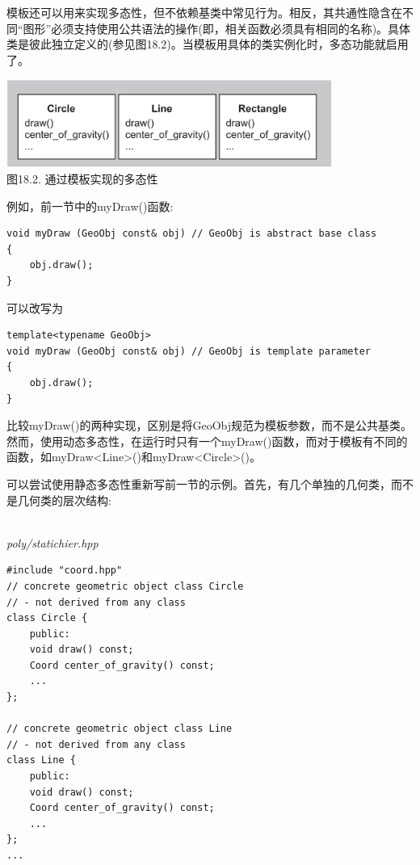 
模板还可以用来实现多态性，但不依赖基类中常见行为。相反，其共通性隐含在不同“图形”必须支持使用公共语法的操作(即，相关函数必须具有相同的名称)。具体类是彼此独立定义的(参见图18.2)。当模板用具体的类实例化时，多态功能就启用了。

\begin{center}
\includegraphics[width=0.8\textwidth]{content/3/chapter18/images/2.png} \\
图18.2. 通过模板实现的多态性
\end{center}

例如，前一节中的myDraw()函数:

\begin{lstlisting}[style=styleCXX]
void myDraw (GeoObj const& obj) // GeoObj is abstract base class
{
	obj.draw();
}
\end{lstlisting}

可以改写为

\begin{lstlisting}[style=styleCXX]
template<typename GeoObj>
void myDraw (GeoObj const& obj) // GeoObj is template parameter
{
	obj.draw();
}
\end{lstlisting}

比较myDraw()的两种实现，区别是将GeoObj规范为模板参数，而不是公共基类。然而，使用动态多态性，在运行时只有一个myDraw()函数，而对于模板有不同的函数，如myDraw<Line>()和myDraw<Circle>()。

可以尝试使用静态多态性重新写前一节的示例。首先，有几个单独的几何类，而不是几何类的层次结构:

\hspace*{\fill} \\ %
\noindent
\textit{poly/statichier.hpp}
\begin{lstlisting}[style=styleCXX]
#include "coord.hpp"
// concrete geometric object class Circle
// - not derived from any class
class Circle {
	public:
	void draw() const;
	Coord center_of_gravity() const;
	...
};

// concrete geometric object class Line
// - not derived from any class
class Line {
	public:
	void draw() const;
	Coord center_of_gravity() const;
	...
};
...
\end{lstlisting}

